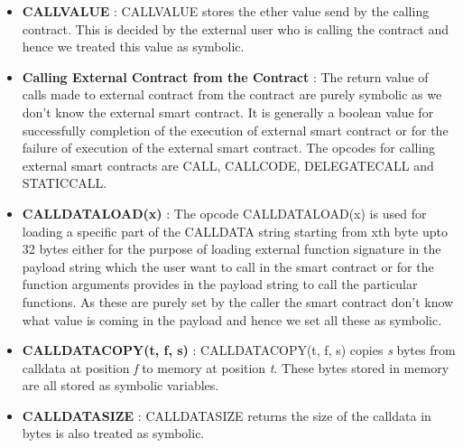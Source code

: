 \begin{itemize}
    \item \textbf{CALLVALUE} : CALLVALUE stores the ether value send by the calling contract. This is decided by the external user who is calling the contract and hence we treated this value as symbolic.
    \item \textbf{Calling External Contract from the Contract} : The return value of calls made to external contract from the contract are purely symbolic as we don't know the external smart contract. It is generally a boolean value for successfully completion of the execution of external smart contract or for the failure of execution of the external smart contract. The opcodes for calling external smart contracts are CALL, CALLCODE, DELEGATECALL and STATICCALL.
    \item \textbf{CALLDATALOAD(x)} : The opcode CALLDATALOAD(x) is used for loading a specific part of the CALLDATA string starting from xth byte upto 32 bytes either for the purpose of loading external function signature in the payload string which the user want to call in the smart contract or for the function arguments provides in the payload string to call the particular functions. As these are purely set by the caller the smart contract don't know what value is coming in the payload and hence we set all these as symbolic.
    \item \textbf{CALLDATACOPY(t, f, s)} : CALLDATACOPY(t, f, s) copies \emph{s} bytes from calldata at position \emph{f} to memory at position \emph{t}. These bytes stored in memory are all stored as symbolic variables.
    \item \textbf{CALLDATASIZE} : CALLDATASIZE returns the size of the calldata in bytes is also treated as symbolic.
\end{itemize}
    
